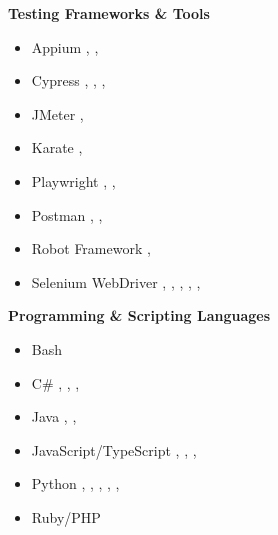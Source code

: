 \item
    \textbf{Testing Frameworks \& Tools}
    \begin{multicols}{3}
    \small{
        \begin{itemize}[itemsep=0mm, topsep=0mm, parsep=0mm, partopsep=0mm]
            \item Appium , , 
            \item Cypress , , , 
            \item JMeter , 
            \item Karate , 
            \item Playwright , , 
            \item Postman , , 
            \item Robot Framework , 
            \item Selenium WebDriver , , , , , 
        \end{itemize}
    }
    \end{multicols}

    \textbf{Programming \& Scripting Languages}
    \begin{multicols}{3}
    \small{
        \begin{itemize}[itemsep=0mm, topsep=0mm, parsep=0mm, partopsep=0mm]
            \item Bash 
            \item C\# , , , 
            \item Java , , 
            \item JavaScript/TypeScript , , , 
            \item Python , , , , , 
            \item Ruby/PHP 
        \end{itemize}
    }
    \end{multicols}
    
